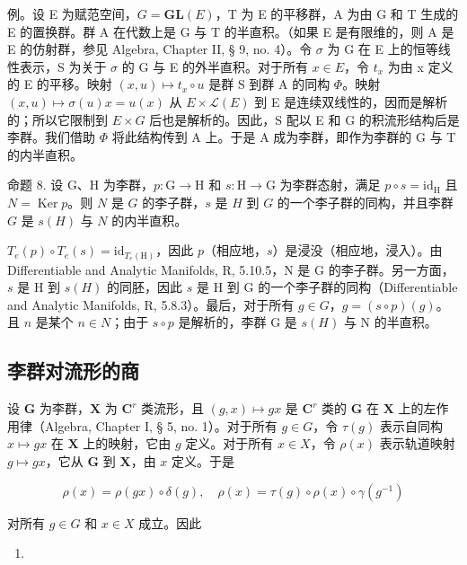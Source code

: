 例。设 E 为赋范空间，\(G = \mathbf{GL}(E)\)，T 为 E 的平移群，A 为由 G 和 T 生成的 E 的置换群。群 A 在代数上是 G 与 T 的半直积。（如果 E 是有限维的，则 A 是 E 的仿射群，参见 Algebra, Chapter II, § 9, no. 4）。令 \(\sigma\) 为 G 在 E 上的恒等线性表示，S 为关于 \(\sigma\) 的 G 与 E 的外半直积。对于所有 \(x \in E\)，令 \(t_{x}\) 为由 x 定义的 E 的平移。映射 \((x, u) \mapsto t_{x} \circ u\) 是群 S 到群 A 的同构 \(\Phi\)。映射 \((x, u) \mapsto \sigma(u)x = u(x)\) 从 \(E \times \mathcal{L}(E)\) 到 E 是连续双线性的，因而是解析的；所以它限制到 \(E \times G\) 后也是解析的。因此，S 配以 E 和 G 的积流形结构后是李群。我们借助 \(\Phi\) 将此结构传到 A 上。于是 A 成为李群，即作为李群的 G 与 T 的内半直积。

命题 8. 设 G、H 为李群，\(p: \mathrm{G} \to \mathrm{H}\) 和 \(s: \mathrm{H} \to \mathrm{G}\) 为李群态射，满足 \(p \circ s = \mathrm{id}_{\mathrm{H}}\) 且 \(N = \operatorname{Ker} p\)。则 \(N\) 是 \(G\) 的李子群，\(s\) 是 \(H\) 到 \(G\) 的一个李子群的同构，并且李群 \(G\) 是 \(s(H)\) 与 \(N\) 的内半直积。

\(T_{e}(p) \circ T_{e}(s) = \mathrm{id}_{T_{e}(\mathrm{H})}\)，因此 \(p\)（相应地，\(s\)）是浸没（相应地，浸入）。由 Differentiable and Analytic Manifolds, R, 5.10.5，N 是 G 的李子群。另一方面，\(s\) 是 H 到 \(s(H)\) 的同胚，因此 \(s\) 是 H 到 G 的一个李子群的同构（Differentiable and Analytic Manifolds, R, 5.8.3）。最后，对于所有 \(g \in G\)，\(g = (s \circ p)(g)\)。且 \(n\) 是某个 \(n \in N\)；由于 \(s \circ p\) 是解析的，李群 G 是 \(s(H)\) 与 N 的半直积。

\subsection{李群对流形的商}

设 \(\mathbf{G}\) 为李群，\(\mathbf{X}\) 为 \(\mathbf{C}^r\) 类流形，且 \((g,x)\mapsto gx\) 是 \(\mathbf{C}^r\) 类的 \(\mathbf{G}\) 在 \(\mathbf{X}\) 上的左作用律（Algebra, Chapter I, § 5, no. 1）。对于所有 \(g\in G\)，令 \(\tau (g)\) 表示自同构 \(x\mapsto gx\) 在 \(\mathbf{X}\) 上的映射，它由 \(g\) 定义。对于所有 \(x\in X\)，令 \(\rho (x)\) 表示轨道映射 \(g\mapsto gx\)，它从 \(\mathbf{G}\) 到 \(\mathbf{X}\)，由 \(x\) 定义。于是

\[
\rho (x) = \rho (g x) \circ \delta (g), \quad \rho (x) = \tau (g) \circ \rho (x) \circ \gamma (g ^ {- 1})\tag{3}
\]

对所有 \(g\in G\) 和 \(x\in X\) 成立。因此

\begin{enumerate}
\def\labelenumi{(\arabic{enumi})}
\setcounter{enumi}{3}
\tightlist
\item
\end{enumerate}

